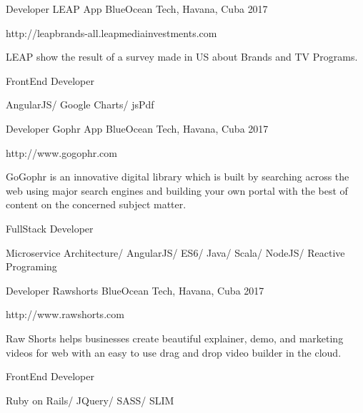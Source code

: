 \begin{cventries}

\cventry
{Developer} %
{LEAP App} %
{BlueOcean Tech, Havana, Cuba} %
{2017} %
{ %
\begin{cvitems}
\item {http://leapbrands-all.leapmediainvestments.com}
\item {LEAP show the result of a survey made in US about Brands and TV Programs.}
\item {FrontEnd Developer}
\item {AngularJS/ Google Charts/ jsPdf}
\end{cvitems}
}


\cventry
{Developer} %
{Gophr App} %
{BlueOcean Tech, Havana, Cuba} %
{2017} %
{ %
\begin{cvitems}
\item {http://www.gogophr.com}
\item {GoGophr is an innovative digital library which is built by searching across the web using major search engines and building your own portal with the best of content on the concerned subject matter.}
\item {FullStack Developer}
\item {Microservice Architecture/ AngularJS/ ES6/ Java/ Scala/ NodeJS/ Reactive Programing}
\end{cvitems}
}


\cventry
{Developer} %
{Rawshorts} %
{BlueOcean Tech, Havana, Cuba} %
{2017} %
{ %
\begin{cvitems}
\item {http://www.rawshorts.com}
\item {Raw Shorts helps businesses create beautiful explainer, demo, and marketing videos for web with an easy to use drag and drop video builder in the cloud.}
\item {FrontEnd Developer}
\item {Ruby on Rails/ JQuery/ SASS/ SLIM}
\end{cvitems}
}



\end{cventries}
